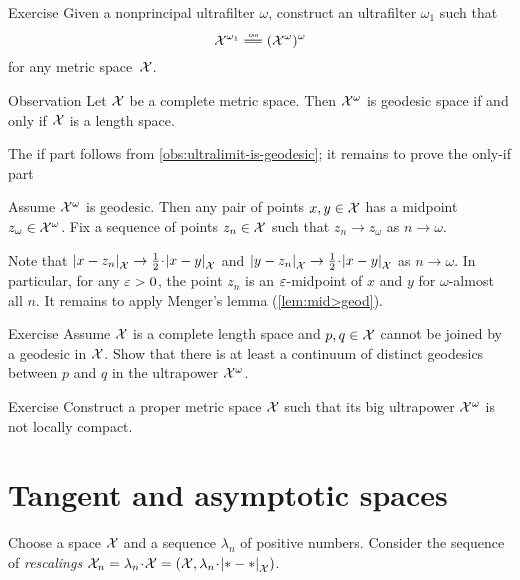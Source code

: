 \begin{thm}{Exercise}\label{ex:ultrapower(ultrapower)}
Given a nonprincipal ultrafilter $\omega$, construct an ultrafilter $\omega_1$ such that 
\[\spc{X}^{\omega_1}\iso(\spc{X}^\omega)^\omega\]
for any metric space~$\mathcal{X}$.

\end{thm}


\begin{thm}{Observation}\label{obs:ultrapower-is-geodesic}
Let $\mathcal{X}$ be a complete metric space. 
Then $\mathcal{X}^\omega$ is geodesic space if and only if $\mathcal{X}$ is a length space.
\end{thm}

The if part follows from \ref{obs:ultralimit-is-geodesic}; it remains to prove the only-if part

Assume $\mathcal{X}^\omega$ is geodesic.
Then any pair of points $x,y\in \mathcal{X}$ has a midpoint $z_\omega\in\mathcal{X}^\omega$.
Fix a sequence of points $z_n\in  \mathcal{X}$ such that $z_n\to z_\omega$ as $n\to \omega$.

Note that 
$\dist{x}{z_n}{\spc{X}}\to \tfrac12\cdot \dist{x}{y}{\spc{X}}$
and 
$\dist{y}{z_n}{\spc{X}}\to \tfrac12\cdot \dist{x}{y}{\spc{X}}$
as 
$n\to\omega$.
In particular, for any $\varepsilon>0$, the point $z_n$ is an $\varepsilon$-midpoint of $x$ and $y$ for $\omega$-almost all $n$.
It remains to apply Menger's lemma (\ref{lem:mid>geod}).
\qeds

\begin{thm}{Exercise}\label{ex:two-geodesics-in-ultrapower}
Assume $\mathcal{X}$ is a complete length space 
and $p,q\in\mathcal{X}$ cannot be joined by a geodesic in $\mathcal{X}$.  
Show that there is at least a continuum of distinct geodesics between $p$ and $q$ 
in the ultrapower $\mathcal{X}^\omega$.
\end{thm}

\begin{thm}{Exercise}\label{ex:notproper-limit}
Construct a proper metric space $\mathcal{X}$ such that its big ultrapower $\mathcal{X}^\omega$ is not locally compact.
\end{thm}

\section{Tangent and asymptotic spaces}
\label{sec:tan+asymptotic}

Choose a space $\mathcal{X}$ and a sequence $\lambda_n$ of positive numbers.
Consider the sequence of \emph{rescalings} $\spc{X}_n=\lambda_n\cdot\spc{X}=(\spc{X},\lambda_n\cdot\dist{*}{*}{\spc{X}})$.

